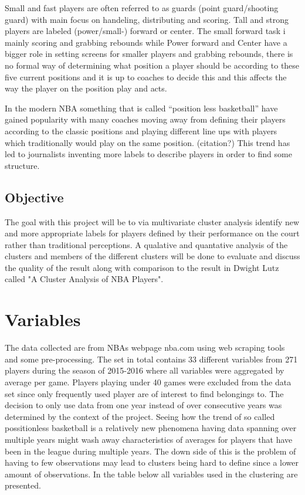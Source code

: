 \documentclass{article}
\begin{document}
Small and fast players are often referred to as guards (point guard/shooting guard) with main focus on handeling, distributing and scoring. Tall and strong players are labeled (power/small-) forward or center. The small forward task i mainly scoring and grabbing rebounds while Power forward and Center have a bigger role in setting screens for smaller players and grabbing rebounds, there is no formal way of determining what position a player should be according to these five current positions and it is up to coaches to decide this and this affects the way the player on the position play and acts.


In the modern NBA something that is called “position less basketball” have gained popularity with many coaches moving away from defining their players according to the classic positions and playing different line ups with players which traditionally would play on the same position. (citation?) This trend has led to journalists inventing more labels to describe players in order to find some structure.

\subsection{Objective}

The goal with this project will be to via multivariate cluster analysis identify new and more appropriate labels for players defined by their performance on the court rather than traditional perceptions. A qualative and quantative analysis of the clusters and members of the different clusters will be done to evaluate and discuss the quality of the result along with comparison to the result in Dwight Lutz called "A Cluster Analysis of NBA Players".



\section{Variables}

The data collected are from NBAs webpage nba.com using web scraping tools and some pre-processing. The set in total contains 33 different variables from 271 players during the season of 2015-2016 where all variables were aggregated by average per game. Players playing under 40 games were excluded from the data set since only frequently used player are of interest to find belongings to. The decision to only use data from one year instead of over consecutive years was determined by the context of the project. Seeing how the trend of so called possitionless basketball is a relatively new phenomena having data spanning over multiple years might wash away characteristics of averages for players that have been in the league during multiple years. The down side of this is the problem of having to few observations may lead to clusters being hard to define since a lower amount of observations. In the table below all variables used in the clustering are presented.
\end{document}

